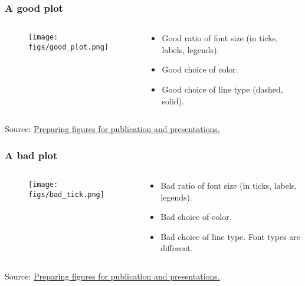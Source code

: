 \documentclass[hyperref={pdfpagelayout=SinglePage}]{beamer}
\def\tcb{\color{blue}}
\begin{document}
\begin{frame}[fragile]
\frametitle{A good plot}

\begin{columns}

    \begin{column}{0.5\textwidth}
    \begin{figure}
        \texttt{[image: figs/good\_plot.png]}
    \end{figure}
    \end{column}
    \begin{column}{0.4\textwidth}
    \begin{itemize}
        \item Good ratio of font size (in ticks, labels, legends).
        \item Good choice of color.
        \item Good choice of line type (dashed, solid).
    \end{itemize}

    \end{column}
\end{columns}
Source: \href{http://www.mrl.ucsb.edu/~seshadri/PreparingFigures.pdf}{\tcb Preparing figures for publication and presentations.}
\end{frame}

\begin{frame}[fragile]
\frametitle{A bad plot}

\begin{columns}

    \begin{column}{0.5\textwidth}
    \begin{figure}
        \texttt{[image: figs/bad\_tick.png]}
    \end{figure}
    \end{column}
    \begin{column}{0.4\textwidth}
    \begin{itemize}
        \item Bad ratio of font size (in ticks, labels, legends).
        \item Bad choice of color.
        \item Bad choice of line type.
        \itme Font types are different.
    \end{itemize}

    \end{column}
\end{columns}
Source: \href{http://www.mrl.ucsb.edu/~seshadri/PreparingFigures.pdf}{\tcb Preparing figures for publication and presentations.}
\end{frame}
\end{document}
